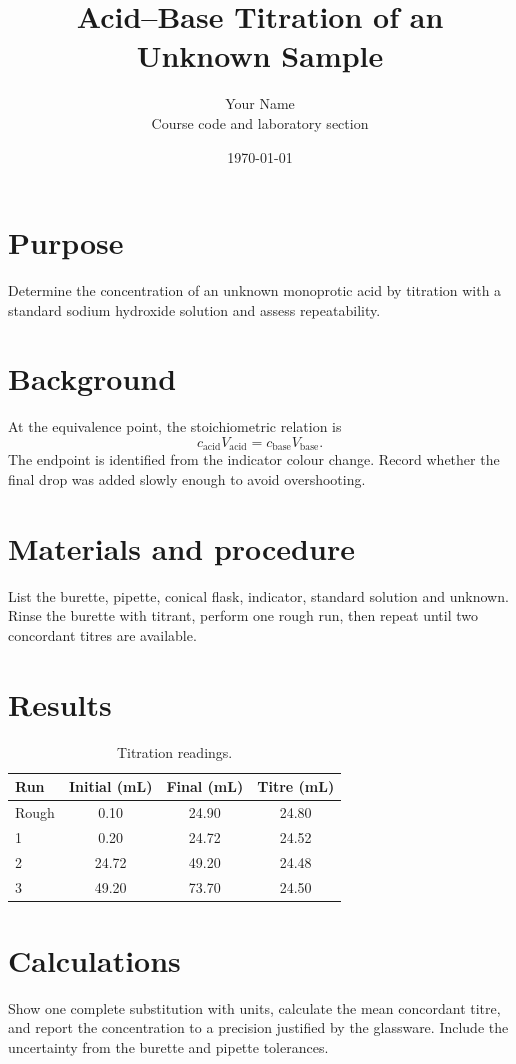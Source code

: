 \documentclass[11pt]{article}
\title{Acid--Base Titration of an Unknown Sample}
\author{Your Name\\Course code and laboratory section}
\date{\today}
\begin{document}
\maketitle
\section{Purpose}
Determine the concentration of an unknown monoprotic acid by titration with a
standard sodium hydroxide solution and assess repeatability.

\section{Background}
At the equivalence point, the stoichiometric relation is
\[
  c_\mathrm{acid}V_\mathrm{acid}=c_\mathrm{base}V_\mathrm{base}.
\]
The endpoint is identified from the indicator colour change. Record whether
the final drop was added slowly enough to avoid overshooting.

\section{Materials and procedure}
List the burette, pipette, conical flask, indicator, standard solution and
unknown. Rinse the burette with titrant, perform one rough run, then repeat
until two concordant titres are available.

\section{Results}
\begin{table}[ht]
\centering
\caption{Titration readings.}
\begin{tabular}{@{}l S[table-format=2.2] S[table-format=2.2] S[table-format=2.2]@{}}
\toprule
Run & {Initial (mL)} & {Final (mL)} & {Titre (mL)}\\
\midrule
Rough & 0.10 & 24.90 & 24.80\\
1 & 0.20 & 24.72 & 24.52\\
2 & 24.72 & 49.20 & 24.48\\
3 & 49.20 & 73.70 & 24.50\\
\bottomrule
\end{tabular}
\end{table}

\section{Calculations}
Show one complete substitution with units, calculate the mean concordant titre,
and report the concentration to a precision justified by the glassware. Include
the uncertainty from the burette and pipette tolerances.
\end{document}
